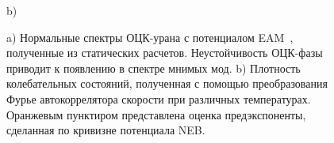 \documentclass[master,14pt,subf,href,colorlinks=true
]{disser}
\begin{document}
\begin{figure}[h]
\begin{center}
\begin{minipage}[h]{.7\linewidth}
 b) \\
\end{minipage}
\caption{a) Нормальные спектры ОЦК-урана с потенциалом EAM~\cite{U_SSS_2012}, полученные из статических расчетов. Неустойчивость ОЦК-фазы приводит к появлению в спектре мнимых мод. b) Плотность колебательных состояний, полученная с помощью преобразования Фурье автокоррелятора скорости при различных температурах. Оранжевым пунктиром представлена оценка предэкспоненты, сделанная по кривизне потенциала NEB.}
\label{graph_frequency}
\end{center}
\end{figure}
\end{document}
